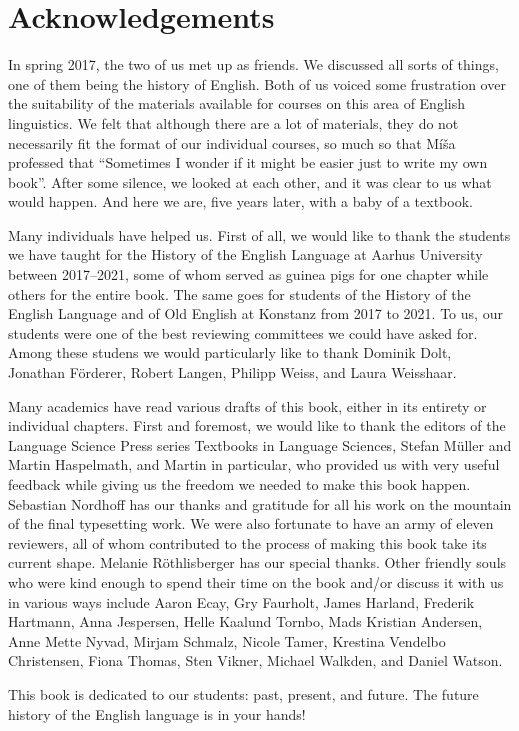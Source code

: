 \chapter{Acknowledgements}\label{acknowledgments}

In spring 2017, the two of us met up as friends. We discussed all sorts of things, one of them being the history of English. Both of us voiced some frustration over the suitability of the materials available for courses on this area of English linguistics. We felt that although there are a lot of materials, they do not necessarily fit the format of our individual courses, so much so that Míša professed that ``Sometimes I wonder if it might be easier just to write my own book''. After some silence, we looked at each other, and it was clear to us what would happen. And here we are, five years later, with a baby of a textbook.

Many individuals have helped us. First of all, we would like to thank the students we have taught for the History of the English Language at Aarhus University between 2017--2021, some of whom served as guinea pigs for one chapter while others for the entire book. The same goes for students of the History of the English Language and of Old English at Konstanz from 2017 to 2021. To us, our students were one of the best reviewing committees we could have asked for. Among these studens we would particularly like to thank Dominik Dolt, Jonathan Förderer, Robert Langen, Philipp Weiss, and Laura Weisshaar.

Many academics have read various drafts of this book, either in its entirety or individual chapters. First and foremost, we would like to thank the editors of the Language Science Press series Textbooks in Language Sciences, Stefan Müller and Martin Haspelmath, and Martin in particular, who provided us with very useful feedback while giving us the freedom we needed to make this book happen. Sebastian Nordhoff has our thanks and gratitude for all his work on the mountain of the final typesetting work. We were also fortunate to have an army of eleven reviewers, all of whom contributed to the process of making this book take its current shape. Melanie Röthlisberger has our special thanks. Other friendly souls who were kind enough to spend their time on the book and/or discuss it with us in various ways include Aaron Ecay, Gry Faurholt, James Harland, Frederik Hartmann, Anna Jespersen, Helle Kaalund Tornbo, Mads Kristian Andersen, Anne Mette Nyvad, Mirjam Schmalz, Nicole Tamer, Krestina Vendelbo Christensen, Fiona Thomas, Sten Vikner, Michael Walkden, and Daniel Watson.

This book is dedicated to our students: past, present, and future. The future history of the English language is in your hands!